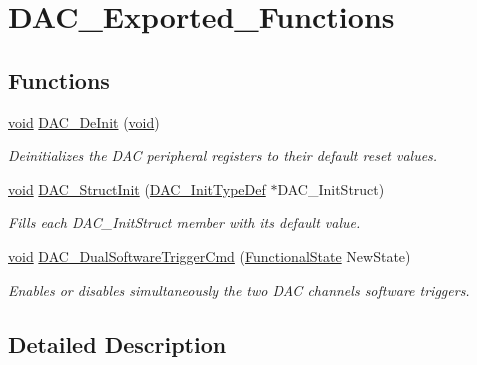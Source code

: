 \hypertarget{group___d_a_c___exported___functions}{}\section{D\+A\+C\+\_\+\+Exported\+\_\+\+Functions}
\label{group___d_a_c___exported___functions}
\subsection*{Functions}
\begin{DoxyCompactItemize}
\item 
\hyperlink{usb__devapi_8h_afabf60e7f57651d6d595a02c75f07cd0}{void} \hyperlink{group___d_a_c___exported___functions_ga1fae225204e1e049d6795319e99ba8bc}{D\+A\+C\+\_\+\+De\+Init} (\hyperlink{usb__devapi_8h_afabf60e7f57651d6d595a02c75f07cd0}{void})
\begin{DoxyCompactList}\small\item\em Deinitializes the D\+AC peripheral registers to their default reset values. \end{DoxyCompactList}\item 
\hyperlink{usb__devapi_8h_afabf60e7f57651d6d595a02c75f07cd0}{void} \hyperlink{group___d_a_c___exported___functions_gadfc270974d54cb5fa5f92556015c4046}{D\+A\+C\+\_\+\+Struct\+Init} (\hyperlink{struct_d_a_c___init_type_def}{D\+A\+C\+\_\+\+Init\+Type\+Def} $\ast$D\+A\+C\+\_\+\+Init\+Struct)
\begin{DoxyCompactList}\small\item\em Fills each D\+A\+C\+\_\+\+Init\+Struct member with its default value. \end{DoxyCompactList}\item 
\hyperlink{usb__devapi_8h_afabf60e7f57651d6d595a02c75f07cd0}{void} \hyperlink{group___d_a_c___exported___functions_gab4d3b364a6b184dcd65f3b294ebf56dc}{D\+A\+C\+\_\+\+Dual\+Software\+Trigger\+Cmd} (\hyperlink{agilefox_2library_2inc_2stm32f10x__type_8h_ac9a7e9a35d2513ec15c3b537aaa4fba1}{Functional\+State} New\+State)
\begin{DoxyCompactList}\small\item\em Enables or disables simultaneously the two D\+AC channels software triggers. \end{DoxyCompactList}\end{DoxyCompactItemize}


\subsection{Detailed Description}


